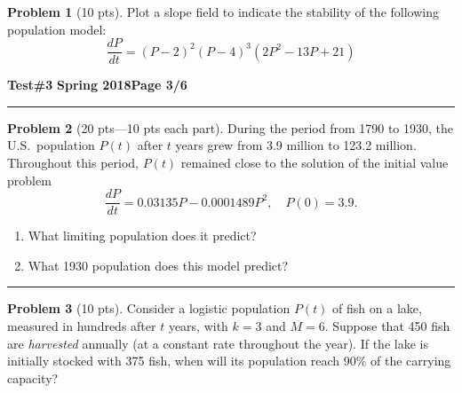 \documentclass[12pt]{article}
\theoremstyle{definition}
\newtheorem{problem}{Problem}
\begin{document}
\begin{problem}[10 pts]
Plot a slope field to indicate the stability of the following population model:
\begin{equation*}
\frac{dP}{dt} = (P-2)^2(P-4)^3(2P^2-13P+21)
\end{equation*}
\end{problem}

\newpage

\hfill{\large\bf Test\#3}\hfill{\large\bf
  Spring 2018}\hfill{\large\bf Page 3/6}\hrule

\bigskip
\begin{problem}[20 pts---10 pts each part]
During the period from 1790 to 1930, the U.S.~population $P(t)$ after $t$ years grew from 3.9 million to 123.2 million.  Throughout this period, $P(t)$ remained close to the solution of the initial value problem
\begin{equation*}
\frac{dP}{dt} = 0.03135 P - 0.0001489 P^2, \quad P(0) = 3.9.
\end{equation*}
\begin{enumerate}
  \item What limiting population does it predict?
  \vspace{0.5cm}
  \begin{flushright}
  \end{flushright}
  \item What 1930 population does this model predict?
  \vspace{4cm}
  \begin{flushright}
  \end{flushright}
\end{enumerate}
\end{problem}
\hrule

\begin{problem}[10 pts]
Consider a logistic population $P(t)$ of fish on a lake, measured in hundreds after $t$ years, with $k=3$ and $M=6$.  Suppose that 450 fish are \emph{harvested} annually (at a constant rate throughout the year).  If the lake is initially stocked with 375 fish, when will its population reach 90\% of the carrying capacity?
\vspace{5cm}
\begin{flushright}
  \end{flushright}
\end{problem}
\end{document}
